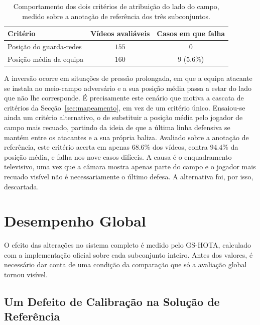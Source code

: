 \begin{table}[htbp]
    \centering
    \caption{Comportamento dos dois critérios de atribuição do lado do campo, medido sobre a
    anotação de referência dos três subconjuntos.}
    \label{tab:lado-inversoes}
    \begin{tabular}{|l|c|c|}
        \hline
        \textbf{Critério} & \textbf{Vídeos avaliáveis} & \textbf{Casos em que falha} \\
        \hline
        Posição do guarda-redes  & $155$ & $0$ \\
        \hline
        Posição média da equipa  & $160$ & $9$ ($5.6\%$) \\
        \hline
    \end{tabular}
\end{table}

A inversão ocorre em situações de pressão prolongada, em que a equipa atacante se instala no
meio-campo adversário e a sua posição média passa a estar do lado que não lhe corresponde. É
precisamente este cenário que motiva a cascata de critérios da Secção~\ref{sec:mapeamento}, em vez
de um critério único. Ensaiou-se ainda um critério alternativo, o de substituir a posição média pelo
jogador de campo mais recuado, partindo da ideia de que a última linha defensiva se mantém entre os
atacantes e a sua própria baliza. Avaliado sobre a anotação de referência, este critério acerta em
apenas $68.6\%$ dos vídeos, contra $94.4\%$ da posição média, e falha nos nove casos difíceis. A
causa é o enquadramento televisivo, uma vez que a câmara mostra apenas parte do campo e o jogador
mais recuado visível não é necessariamente o último defesa. A alternativa foi, por isso, descartada.

\section{Desempenho Global}\label{sec:desempenho_global}\label{sec:desempenho-global}

O efeito das alterações no sistema completo é medido pelo GS-HOTA, calculado com a implementação
oficial sobre cada subconjunto inteiro. Antes dos valores, é necessário dar conta de uma condição
da comparação que só a avaliação global tornou visível.

\subsection{Um Defeito de Calibração na Solução de Referência}\label{sec:res_calib_defeito}

